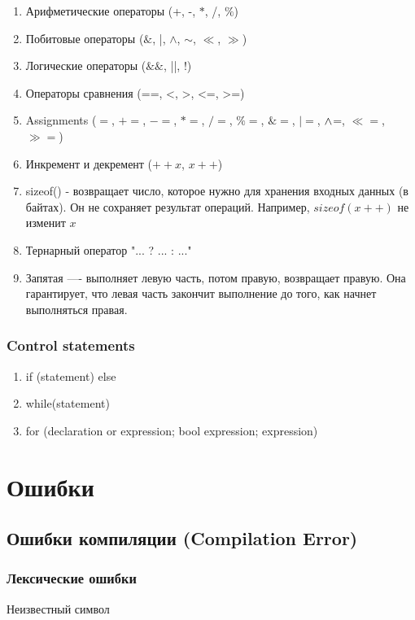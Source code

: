 \documentclass[12pt]{article}
\begin{document}
\begin{enumerate}
	\item Арифметические операторы (+, -, $\ast$, /, $\%$) 
	\item Побитовые операторы ($\&$, |, $\wedge$, $\sim$, $\ll$, $\gg$)
	\item Логические операторы ($\&\&$, ||, !)
	\item Операторы сравнения (==, <, >, <=, >=)
	\item Assignments ($=$, $+=$, $-=$, $\ast=$, $/=$, $\%=$, $\&=$, $|=$, $\space\wedge$=, $\ll=$, $\gg=$)
	\item Инкремент и декремент ($++x$, $x++$)
	\item sizeof() - возвращает число, которое нужно для хранения входных данных (в байтах). Он не сохраняет результат операций. Например, $sizeof(x++)$ не изменит $x$
	\item Тернарный оператор "... ? ... : ..."
	\item Запятая ---- выполняет левую часть, потом правую, возвращает правую. Она гарантирует, что левая часть закончит выполнение до того, как начнет выполняться правая. 
\end{enumerate} 

\subsubsection{Control statements}

\begin{enumerate}
	\item if (statement) {} else {}
	\item while(statement){}
	\item for (declaration or expression; bool expression; expression){}
\end{enumerate}

\section{Ошибки}

\subsection[Compilation Error]{Ошибки компиляции (Compilation Error)} 

\subsubsection{Лексические ошибки}
Неизвестный символ
\end{document}
